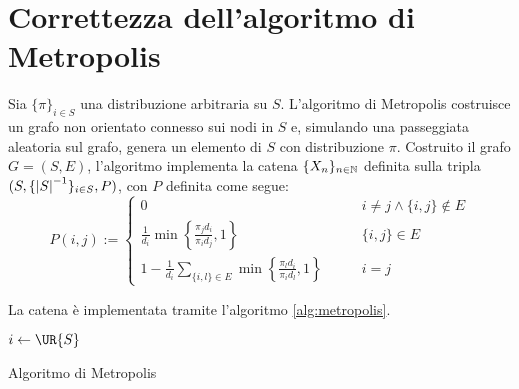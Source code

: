 \section{Correttezza dell'algoritmo di Metropolis}

Sia $\{\pi\}_{i\in S}$ una distribuzione arbitraria su $S$. L'algoritmo di Metropolis costruisce un grafo non orientato connesso sui nodi in $S$ e, simulando una passeggiata aleatoria sul grafo, genera un elemento di $S$ con distribuzione $\pi$.
Costruito il grafo $G=(S,E)$, l'algoritmo implementa la catena $\{X_n\}_{n\in\mathbb N}$ definita sulla tripla $(S,\{\left|S\right|^{-1}\}_{i\in S},P)$, con $P$ definita come segue:
\begin{equation*}
	P(i,j):=\begin{cases}
		0                                                                                                    & \qquad i\ne j\land \{i,j\}\notin E \\[1ex]
		\displaystyle \frac{1}{d_i} \min\left\{\frac{\pi_j d_i}{\pi_i d_j},1\right\}                         & \qquad \{i,j\}\in E                \\[2ex]
		\displaystyle 1 - \frac{1}{d_i} \sum_{\{i,l\}\in E} \min\left\{\frac{\pi_l d_i}{\pi_i d_l},1\right\} & \qquad i=j
	\end{cases}
\end{equation*}

La catena è implementata tramite l'algoritmo \ref{alg:metropolis}.
\begin{algorithm}
	\DontPrintSemicolon

	$i\asn\UR{S}$ \;

	 \;

	\caption{Algoritmo di Metropolis}
	\label{alg:metropolis}
\end{algorithm}

